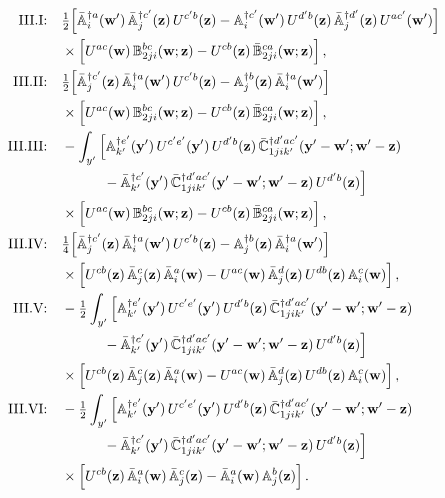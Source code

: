\begin{align}
\text{III.I:}\quad&\tfrac12\Big[\bar{\mathbb{A}}^{\dagger a}_i(\mathbf{w}')\,\bar{\mathbb{A}}^{\dagger c'}_j(\mathbf{z})\,U^{c'b}(\mathbf{z})-\mathbb{A}^{\dagger c'}_i(\mathbf{w}')\,U^{d'b}(\mathbf{z})\,\bar{\mathbb{A}}^{\dagger d'}_j(\mathbf{z})\,U^{ac'}(\mathbf{w}')\Big]\notag\\
&\times\Big[U^{ac}(\mathbf{w})\,\mathbb{B}^{bc}_{2ji}(\mathbf{w};\mathbf{z})-U^{cb}(\mathbf{z})\,\bar{\mathbb{B}}^{ca}_{2ji}(\mathbf{w};\mathbf{z})\Big]\,,\notag\\
\text{III.II:}\quad&\tfrac12\Big[\bar{\mathbb{A}}^{\dagger c'}_j(\mathbf{z})\,\bar{\mathbb{A}}^{\dagger a}_i(\mathbf{w}')\,U^{c'b}(\mathbf{z})-\mathbb{A}^{\dagger b}_j(\mathbf{z})\,\bar{\mathbb{A}}^{\dagger a}_i(\mathbf{w}')\Big]\notag\\&\times\Big[U^{ac}(\mathbf{w})\,\mathbb{B}^{bc}_{2ji}(\mathbf{w};\mathbf{z})-U^{cb}(\mathbf{z})\,\bar{\mathbb{B}}^{ca}_{2ji}(\mathbf{w};\mathbf{z})\Big]\,,\notag\\
\text{III.III:}\quad&-\int_{y'}\Big[\mathbb{A}^{\dagger e'}_{k'}(\mathbf{y}')\,U^{c'e'}(\mathbf{y}')\,U^{d'b}(\mathbf{z})\,\bar{\mathbb{C}}^{\dagger d'ac'}_{1jik'}(\mathbf{y}'-\mathbf{w}';\mathbf{w}'-\mathbf{z})\notag\\&\qquad\quad-\bar{\mathbb{A}}^{\dagger c'}_{k'}(\mathbf{y}')\,\bar{\mathbb{C}}^{\dagger d'ac'}_{1jik'}(\mathbf{y}'-\mathbf{w}';\mathbf{w}'-\mathbf{z})\,U^{d'b}(\mathbf{z})\Big]\notag\\
&\times\Big[U^{ac}(\mathbf{w})\,\mathbb{B}^{bc}_{2ji}(\mathbf{w};\mathbf{z})-U^{cb}(\mathbf{z})\,\bar{\mathbb{B}}^{ca}_{2ji}(\mathbf{w};\mathbf{z})\Big]\,,\notag\\
\text{III.IV:}\quad&\tfrac14\Big[\bar{\mathbb{A}}^{\dagger c'}_j(\mathbf{z})\,\bar{\mathbb{A}}^{\dagger a}_i(\mathbf{w}')\,U^{c'b}(\mathbf{z})-\mathbb{A}^{\dagger b}_j(\mathbf{z})\,\bar{\mathbb{A}}^{\dagger a}_i(\mathbf{w}')\Big]\notag\\
&\times\Big[U^{cb}(\mathbf{z})\,\bar{\mathbb{A}}^c_j(\mathbf{z})\,\bar{\mathbb{A}}^a_i(\mathbf{w})-U^{ac}(\mathbf{w})\,\bar{\mathbb{A}}^d_j(\mathbf{z})\,U^{db}(\mathbf{z})\,\mathbb{A}^c_i(\mathbf{w})\Big]\,,\notag\\
\text{III.V:}\quad&-\tfrac12\int_{y'}\Big[\mathbb{A}^{\dagger e'}_{k'}(\mathbf{y}')\,U^{c'e'}(\mathbf{y}')\,U^{d'b}(\mathbf{z})\,\bar{\mathbb{C}}^{\dagger d'ac'}_{1jik'}(\mathbf{y}'-\mathbf{w}';\mathbf{w}'-\mathbf{z})\notag\\&\qquad\quad-\bar{\mathbb{A}}^{\dagger c'}_{k'}(\mathbf{y}')\,\bar{\mathbb{C}}^{\dagger d'ac'}_{1jik'}(\mathbf{y}'-\mathbf{w}';\mathbf{w}'-\mathbf{z})\,U^{d'b}(\mathbf{z})\Big]\notag\\
&\times\Big[U^{cb}(\mathbf{z})\,\bar{\mathbb{A}}^c_j(\mathbf{z})\,\bar{\mathbb{A}}^a_i(\mathbf{w})-U^{ac}(\mathbf{w})\,\bar{\mathbb{A}}^d_j(\mathbf{z})\,U^{db}(\mathbf{z})\,\mathbb{A}^c_i(\mathbf{w})\Big]\,,\notag\\
\text{III.VI:}\quad&-\tfrac12\int_{y'}\Big[\mathbb{A}^{\dagger e'}_{k'}(\mathbf{y}')\,U^{c'e'}(\mathbf{y}')\,U^{d'b}(\mathbf{z})\,\bar{\mathbb{C}}^{\dagger d'ac'}_{1jik'}(\mathbf{y}'-\mathbf{w}';\mathbf{w}'-\mathbf{z})\notag\\&\qquad\quad-\bar{\mathbb{A}}^{\dagger c'}_{k'}(\mathbf{y}')\,\bar{\mathbb{C}}^{\dagger d'ac'}_{1jik'}(\mathbf{y}'-\mathbf{w}';\mathbf{w}'-\mathbf{z})\,U^{d'b}(\mathbf{z})\Big]\notag\\
&\times\Big[U^{cb}(\mathbf{z})\,\bar{\mathbb{A}}^a_i(\mathbf{w})\,\bar{\mathbb{A}}^c_j(\mathbf{z})-\bar{\mathbb{A}}^a_i(\mathbf{w})\,\mathbb{A}^b_j(\mathbf{z})\Big]\,.\label{eq:GroupIIIexplicit}
\end{align}
